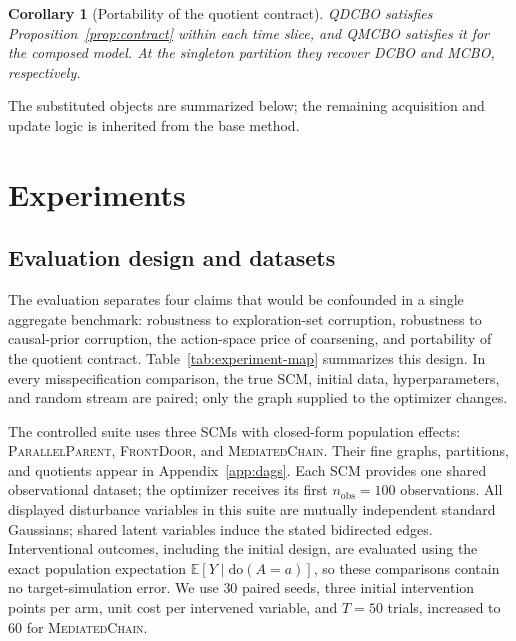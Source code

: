 \documentclass[twoside]{article}
\newtheorem{corollary}{Corollary}
\newcommand{\E}{\mathbb{E}}
\newcommand{\doo}{\mathrm{do}}
\begin{document}
\begin{corollary}[Portability of the quotient contract]
\label{cor:portability}
QDCBO satisfies Proposition~\ref{prop:contract} within each time slice, and
QMCBO satisfies it for the composed model. At the singleton partition they
recover DCBO and MCBO, respectively.
\end{corollary}

The substituted objects are summarized below; the remaining acquisition and
update logic is inherited from the base method.

\begin{center}
\small
{}
\end{center}

\section{Experiments}
\label{sec:experiments}

\subsection{Evaluation design and datasets}
\label{sec:exp-design}

The evaluation separates four claims that would be confounded in a single
aggregate benchmark: robustness to exploration-set corruption, robustness to
causal-prior corruption, the action-space price of coarsening, and portability
of the quotient contract. Table~\ref{tab:experiment-map} summarizes this
design. In every misspecification comparison, the true SCM, initial data,
hyperparameters, and random stream are paired; only the graph supplied to the
optimizer changes.

The controlled suite uses three SCMs with closed-form population effects:
\textsc{ParallelParent}, \textsc{FrontDoor}, and \textsc{MediatedChain}.
Their fine graphs, partitions, and quotients appear in
Appendix~\ref{app:dags}. Each SCM provides one shared observational dataset;
the optimizer receives its first $n_{\mathrm{obs}}=100$ observations.
All displayed disturbance variables in this suite are mutually independent
standard Gaussians; shared latent variables induce the stated bidirected
edges.
Interventional outcomes, including the initial design, are evaluated using
the exact population expectation $\E[Y\mid\doo(A=a)]$, so these comparisons
contain no target-simulation error. We
use $30$ paired seeds, three initial intervention points per arm, unit cost
per intervened variable, and $T=50$ trials, increased to $60$ for
\textsc{MediatedChain}.
\end{document}
